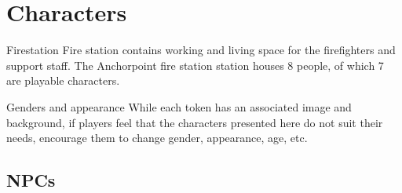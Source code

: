 \chapter{Characters}


\begin{rpg-commentbox}{Firestation}
    Fire station contains working and living space for the firefighters and support staff. The Anchorpoint fire station station houses 8 people, of which 7 are playable characters.
\end{rpg-commentbox}

\begin{rpg-warnbox}{Genders and appearance}
    While each token has an associated image and background, if players feel that the characters presented here do not suit their needs, encourage them to change gender, appearance, age, etc. 
\end{rpg-warnbox}


%

\clearpage






\clearpage


\section{NPCs}




